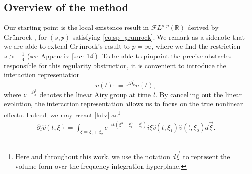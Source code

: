 \documentclass[%
11pt,  reqno]{amsart}
\newcommand{\5}{\textup{V}}
\DeclareMathOperator*{\intt}{\int}
\newcommand{\dx}{\partial_x}
\newcommand{\dt}{\partial_t}
\newtheorem{proposition}[theorem]{Proposition}
\theoremstyle{remark}
\newcommand{\R}{\mathbb{R}}
\numberwithin{equation}{section}
\numberwithin{theorem}{section}
\begin{document}
\subsection{Overview of the method}
\label{SUBSEC:method}

	Our starting point is the local existence result in $\mathcal{F}L^{s,p}(\R)$ derived by Grünrock \cite{Grunrock_ldv_hier}, for $(s,p)$ satisfying \eqref{eq:sp_grunrock}. We remark as a sidenote that we are able to extend Grünrock's result to $p=\infty$, where we find the restriction $s>-\frac14$ (see Appendix \ref{sec:-14}).
	To be able to pinpoint the precise obstacles responsible for this regularity obstruction,  it is convenient to introduce the interaction representation \cite{Ginibre_interaction_rep}
	\begin{equation}\label{inter}
		v(t) : = e^{t\partial_x^3}u(t),
	\end{equation} 
	where $e^{-t\dx^3}$ denotes the linear Airy group at time $t$. By cancelling out the linear evolution, the interaction representation allows us to focus on the true nonlinear effects. Indeed, we may recast \eqref{kdv} as\footnote{Here and throughout this work, we use the notation $d\vec{\xi}$ to represent the volume form over the frequency integration hyperplane.}
	\begin{align}
		\label{dtv}
		\dt{\widehat{v}}(t,\xi) = \intt_{\xi = \xi_1+\xi_2} e^{-it (\xi^3 -\xi_1^3 -
			\xi^3_2)} i \xi \widehat{v}(t,\xi_1) \widehat{v}(t,\xi_2)  d\vec{\xi}
		.
	\end{align}
\end{document}

